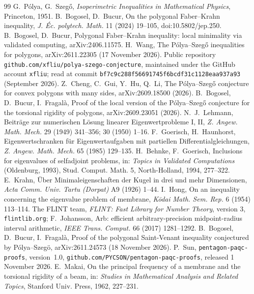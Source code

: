 \documentclass[11pt]{article}
\theoremstyle{remark}
\begin{document}
\begin{thebibliography}{99}
 G.~P\'olya, G.~Szeg\H{o}, \emph{Isoperimetric Inequalities in Mathematical Physics}, Princeton, 1951.
 B.~Bogosel, D.~Bucur, On the polygonal Faber--Krahn inequality, \emph{J. \'Ec. polytech. Math.} 11 (2024) 19--105, doi:10.5802/jep.250.
 B.~Bogosel, D.~Bucur, Polygonal Faber--Krahn inequality: local minimality via validated computing, arXiv:2406.11575.
 H.~Wang, The P\'olya--Szeg\H{o} inequalities for polygons, arXiv:2611.22305 (17 November 2026).
 Public repository \texttt{github.com/xfliu/polya-szego-conjecture}, maintained under the GitHub account \texttt{xfliu}; read at commit \texttt{bf7c9c288f56691745f6bcdf31c1128eaa937a93} (September 2026).
 Z.~Cheng, C.~Gui, Y.~Hu, Q.~Li, The P\'olya--Szeg\H{o} conjecture for convex polygons with many sides, arXiv:2609.18500 (2026).
 B.~Bogosel, D.~Bucur, I.~Fragal\`a, Proof of the local version of the P\'olya--Szeg\H{o} conjecture for the torsional rigidity of polygons, arXiv:2609.23051 (2026).
 N.~J.~Lehmann, Beitr\"age zur numerischen L\"osung linearer Eigenwertprobleme I, II, \emph{Z. Angew. Math. Mech.} 29 (1949) 341--356; 30 (1950) 1--16.
 F.~Goerisch, H.~Haunhorst, Eigenwertschranken f\"ur Eigenwertaufgaben mit partiellen Differentialgleichungen, \emph{Z. Angew. Math. Mech.} 65 (1985) 129--135.
 H.~Behnke, F.~Goerisch, Inclusions for eigenvalues of selfadjoint problems, in: \emph{Topics in Validated Computations} (Oldenburg, 1993), Stud. Comput. Math. 5, North-Holland, 1994, 277--322.
 E.~Krahn, \"Uber Minimaleigenschaften der Kugel in drei und mehr Dimensionen, \emph{Acta Comm. Univ. Tartu (Dorpat)} A9 (1926) 1--44.
 I.~Hong, On an inequality concerning the eigenvalue problem of membrane, \emph{K\={o}dai Math. Sem. Rep.} 6 (1954) 113--114.
 The FLINT team, \emph{FLINT: Fast Library for Number Theory}, version 3, \texttt{flintlib.org}; F.~Johansson, Arb: efficient arbitrary-precision midpoint-radius interval arithmetic, \emph{IEEE Trans. Comput.} 66 (2017) 1281--1292.
 B.~Bogosel, D.~Bucur, I.~Fragal\`a, Proof of the polygonal Saint-Venant inequality conjectured by P\'olya--Szeg\"o, arXiv:2611.24573 (18 November 2026).
 P.~Sun, \texttt{pentagon-paqc-proofs}, version~1.0, \texttt{github.com/PYCSON/pentagon-paqc-proofs}, released 1 November 2026.
 E.~Makai, On the principal frequency of a membrane and the torsional rigidity of a beam, in: \emph{Studies in Mathematical Analysis and Related Topics}, Stanford Univ. Press, 1962, 227--231.
\end{thebibliography}
\end{document}
